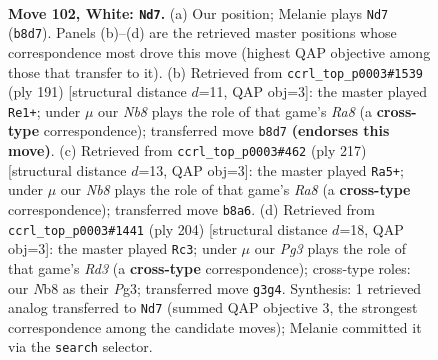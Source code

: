 \documentclass[11pt]{article}
\begin{document}
\clearpage

\begin{figure}[p]\centering
\begin{subfigure}{0.46\textwidth}\centering
\resizebox{\linewidth}{!}{%
\newchessgame
\chessboard[
  setfen={1NR5/6p1/5p1k/7p/7P/6PK/4r3/8 w - - 28 102},
  showmover=false,
  pgfstyle=straightmove, color=movearrow, markmove={b8-d7}
]}
\caption{}
\end{subfigure}\hfill
\begin{subfigure}{0.46\textwidth}\centering
\resizebox{\linewidth}{!}{%
\newchessgame
\chessboard[
  setfen={8/8/6pk/7p/4K2P/3R1PP1/8/r7 b - - 59 96},
  showmover=false,
  pgfstyle=straightmove, color=movearrow, markmove={a1-e1}
]}
\caption{}
\end{subfigure}
\\[4pt]
\begin{subfigure}{0.46\textwidth}\centering
\resizebox{\linewidth}{!}{%
\newchessgame
\chessboard[
  setfen={8/5pk1/7p/5K1P/5PP1/1R6/8/r7 b - - 24 109},
  showmover=false,
  pgfstyle=straightmove, color=movearrow, markmove={a1-a5}
]}
\caption{}
\end{subfigure}\hfill
\begin{subfigure}{0.46\textwidth}\centering
\resizebox{\linewidth}{!}{%
\newchessgame
\chessboard[
  setfen={8/8/6p1/5k1p/7P/3R1PPK/8/r7 w - - 53 103},
  showmover=false,
  pgfstyle=straightmove, color=movearrow, markmove={d3-c3}
]}
\caption{}
\end{subfigure}
\caption{\textbf{Move 102, White: \texttt{Nd7}.} (a) Our position; Melanie plays \texttt{Nd7} (\texttt{b8d7}). Panels (b)--(d) are the retrieved master positions whose correspondence most drove this move (highest QAP objective among those that transfer to it). (b) Retrieved from \texttt{ccrl\_top\_p0003\#1539} (ply 191) [structural distance $d$=11, QAP obj=3]: the master played \texttt{Re1+}; under $\mu$ our \emph{Nb8} plays the role of that game's \emph{Ra8} (a \textbf{cross-type} correspondence); transferred move \texttt{b8d7} \textbf{(endorses this move)}. (c) Retrieved from \texttt{ccrl\_top\_p0003\#462} (ply 217) [structural distance $d$=13, QAP obj=3]: the master played \texttt{Ra5+}; under $\mu$ our \emph{Nb8} plays the role of that game's \emph{Ra8} (a \textbf{cross-type} correspondence); transferred move \texttt{b8a6}. (d) Retrieved from \texttt{ccrl\_top\_p0003\#1441} (ply 204) [structural distance $d$=18, QAP obj=3]: the master played \texttt{Rc3}; under $\mu$ our \emph{Pg3} plays the role of that game's \emph{Rd3} (a \textbf{cross-type} correspondence); cross-type roles: our \emph{N}b8 as their \emph{P}g3; transferred move \texttt{g3g4}. Synthesis: 1 retrieved analog transferred to \texttt{Nd7} (summed QAP objective 3, the strongest correspondence among the candidate moves); Melanie committed it via the \texttt{search} selector.}
\label{fig:thought-m202}
\end{figure}
\end{document}
